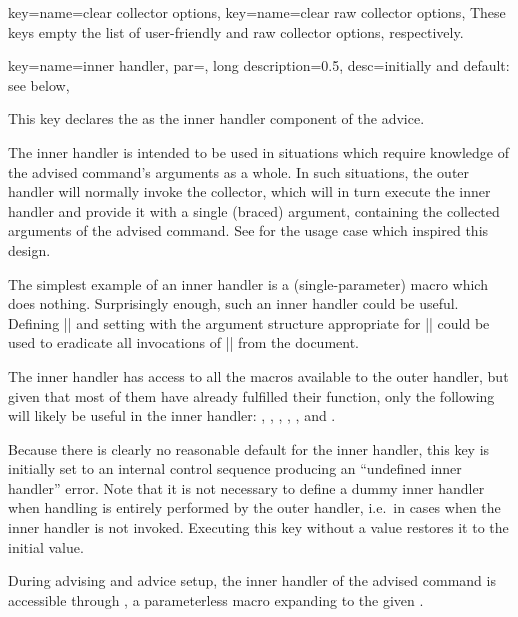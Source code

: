 \documentclass[a4paper,11pt]{article}
\begin{document}
\begin{doc}{
    key={name=clear collector options},
    key={name=clear raw collector options},
  }
  These keys empty the list of user-friendly and raw collector options,
  respectively.
\end{doc}

\begin{doc}{
    key={name=inner handler, par=, long description=0.5,
      desc=initially and default: see below},
  }

  This key declares the  as the inner handler component
  of the advice.

  The inner handler is intended to be used in situations which require
  knowledge of the advised command's arguments as a whole.  In such situations,
  the outer handler will normally invoke the collector, which will in turn
  execute the inner handler and provide it with a single (braced) argument,
  containing the collected arguments of the advised command.  See
   for the usage case which inspired this design.

  The simplest example of an inner handler is a (single-parameter) macro which
  does nothing.  Surprisingly enough, such an inner handler could be useful.
  Defining |\def\Gobble#1{}| and setting
   with the argument structure
  appropriate for |\foo| could be used to eradicate all invocations of |\foo|
  from the document.

  The inner handler has access to all the macros available to the outer
  handler, but given that most of them have already fulfilled their function,
  only the following will likely be useful in the inner handler:
  , , ,
  , , and .

  Because there is clearly no reasonable default for the inner handler, this key
  is initially set to an internal control sequence producing an ``undefined
  inner handler'' error.  Note that it is not necessary to define a dummy inner
  handler when handling is entirely performed by the outer handler, i.e.\ in
  cases when the inner handler is not invoked.  Executing this key without a
  value restores it to the initial value.
  
  During advising and advice setup, the inner handler of the advised command is
  accessible through , a parameterless macro
  expanding to the given .
\end{doc}
\end{document}
